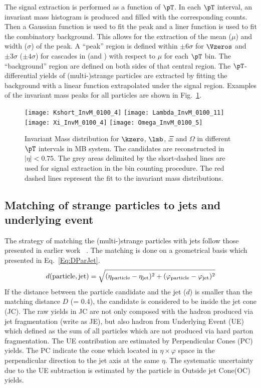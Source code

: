 The signal extraction is performed as a function of $\pT$.
In each $\pT$ interval, an invariant mass histogram is produced and filled with the corresponding counts.
Then a Gaussian function is used to fit the peak and a liner function is used to fit the combinatory background.
This allows for the extraction of the mean ($\mu$) and width ($\sigma$) of the peak.
A ``peak'' region is defined within $\pm 6\sigma$ for $\Vzeros$ and $\pm 3\sigma$ ($\pm 4\sigma$) for cascades in \pp (and \pPb) with respect to $\mu$ for each $\pT$ bin.
The ``background'' region are defined on both sides of that central region.
The $\pT$-differential yields of (multi-)strange particles are extracted by fitting the background with a linear function extrapolated under the signal region.
Examples of the invariant mass peaks for all particles are shown in Fig.~\ref{fig:InvM}.
\begin{figure}[!ht]
\begin{center}
\texttt{[image: Kshort\_InvM\_0100\_4]}
\texttt{[image: Lambda\_InvM\_0100\_11]}
\texttt{[image: Xi\_InvM\_0100\_4]}
\texttt{[image: Omega\_InvM\_0100\_5]}
\caption{Invariant Mass distribution for $\kzero$, $\lmb$, $\Xi$ and $\Omega$ in different $\pT$ intervals in MB \pPb system. The candidates are reconstructed in $|\eta|<0.75$.
The grey areas delimited by the short-dashed lines are used for signal extraction in the bin counting procedure.
The red dashed lines represent the fit to the invariant mass distributions.}
\label{fig:InvM}
\end{center}
\end{figure}

\subsection{Matching of strange particles to jets and underlying event}%
\label{sec:ParJetMatch}

The strategy of matching the (multi-)strange particles with jets follow those presented in earlier work~\cite{V0injet} .
The matching is done on a geometrical basis which presented in Eq.~\ref{Eq:DParJet}.
\begin{equation}
	d(\mathrm{particle, jet}) = \sqrt{(\eta_\mathrm{particle} -\eta_{\rm jet})^{2} + (\varphi_\mathrm{particle} -\varphi_{\rm jet})^{2}}
	\label{Eq:DParJet}
\end{equation}
If the distance between the particle candidate and the jet ($d$) is smaller than the matching distance $D$ (= 0.4), the candidate is considered to be inside the jet cone (JC).
The raw yields in JC are not only composed with the hadron produced via jet fragmentation (write as JE), but also hadron from Underlying Event (UE) which defined as the sum of all particles which are not produced via hard parton fragmentation.
The UE contribution are estimated by Perpendicular Cones (PC) yields.
The PC indicate the cone which located in $\eta \times \varphi$ space in the perpendicular direction to the jet axis at the same $\eta$.
The systematic uncertainty due to the UE subtraction is estimated by the particle in Outside jet Cone(OC) yields. 

